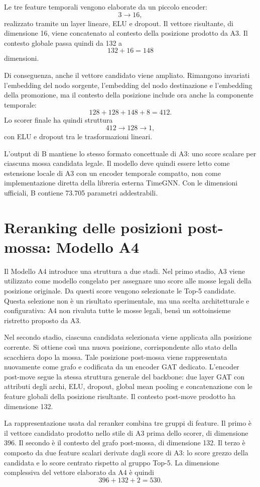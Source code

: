 Le tre feature temporali vengono elaborate da un piccolo encoder:
\[
    3 \rightarrow 16,
\]
realizzato tramite un layer lineare, ELU e dropout. Il vettore risultante, di dimensione 16, viene concatenato al contesto della posizione prodotto da A3. Il contesto globale passa quindi da 132 a
\[
    132 + 16 = 148
\]
dimensioni.

Di conseguenza, anche il vettore candidato viene ampliato. Rimangono invariati l'embedding del nodo sorgente, l'embedding del nodo destinazione e l'embedding della promozione, ma il contesto della posizione include ora anche la componente temporale:
\[
    128 + 128 + 148 + 8 = 412.
\]
Lo scorer finale ha quindi struttura
\[
    412 \rightarrow 128 \rightarrow 1,
\]
con ELU e dropout tra le trasformazioni lineari.

L'output di B mantiene lo stesso formato concettuale di A3: uno score scalare per ciascuna mossa candidata legale. Il modello deve quindi essere letto come estensione locale di A3 con un encoder temporale compatto, non come implementazione diretta della libreria esterna TimeGNN. Con le dimensioni ufficiali, B contiene 73.705 parametri addestrabili.

\section{Reranking delle posizioni post-mossa: Modello A4}

Il Modello A4 introduce una struttura a due stadi. Nel primo stadio, A3 viene utilizzato come modello congelato per assegnare uno score alle mosse legali della posizione originale. Da questi score vengono selezionate le Top-5 candidate. Questa selezione non \`e un risultato sperimentale, ma una scelta architetturale e configurativa: A4 non rivaluta tutte le mosse legali, bens\`i un sottoinsieme ristretto proposto da A3.

Nel secondo stadio, ciascuna candidata selezionata viene applicata alla posizione corrente. Si ottiene cos\`i una nuova posizione, corrispondente allo stato della scacchiera dopo la mossa. Tale posizione post-mossa viene rappresentata nuovamente come grafo e codificata da un encoder GAT dedicato. L'encoder post-move segue la stessa struttura generale del backbone: due layer GAT con attributi degli archi, ELU, dropout, global mean pooling e concatenazione con le feature globali della posizione risultante. Il contesto post-move prodotto ha dimensione 132.

La rappresentazione usata dal reranker combina tre gruppi di feature. Il primo \`e il vettore candidato prodotto nello stile di A3 prima dello scorer, di dimensione 396. Il secondo \`e il contesto del grafo post-mossa, di dimensione 132. Il terzo \`e composto da due feature scalari derivate dagli score di A3: lo score grezzo della candidata e lo score centrato rispetto al gruppo Top-5. La dimensione complessiva del vettore elaborato da A4 \`e quindi
\[
    396 + 132 + 2 = 530.
\]

